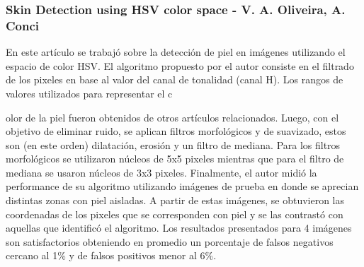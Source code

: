 	
	
	
	\subsubsection{Skin Detection using HSV color space - V. A. Oliveira, A. Conci}
	En este artículo se trabajó sobre la detección de piel en imágenes utilizando el espacio de color HSV. El algoritmo propuesto 
por el autor consiste en el filtrado de los pixeles en base al valor del canal de tonalidad (canal H). Los rangos de valores utilizados para 
representar el c

olor de la piel fueron obtenidos de otros artículos relacionados. Luego, con el objetivo de eliminar ruido, se aplican filtros morfológicos y de suavizado, estos son (en este orden) dilatación, erosión y un filtro de mediana. Para los filtros morfológicos se utilizaron núcleos de 5x5 pixeles mientras que para el filtro de mediana se usaron núcleos de 3x3 pixeles. Finalmente, el autor midió la performance de su algoritmo utilizando imágenes de prueba en donde se aprecian distintas zonas con piel aisladas. A partir de estas imágenes, se obtuvieron las coordenadas de los pixeles que se corresponden con piel y se las contrastó con aquellas que identificó el algoritmo. Los resultados presentados para 4 imágenes son satisfactorios obteniendo en promedio un porcentaje de falsos negativos cercano al 1\% y de falsos positivos menor al 6\%.

